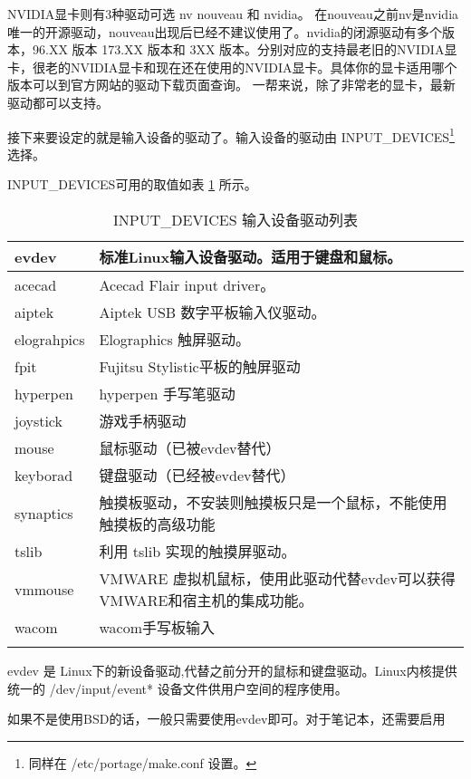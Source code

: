 NVIDIA显卡则有3种驱动可选 nv nouveau 和 nvidia。 在nouveau之前nv是nvidia唯一的开源驱动，nouveau出现后已经不建议使用了。nvidia的闭源驱动有多个版本，96.XX 版本 173.XX 版本和 3XX 版本。分别对应的支持最老旧的NVIDIA显卡，很老的NVIDIA显卡和现在还在使用的NVIDIA显卡。具体你的显卡适用哪个版本可以到官方网站的驱动下载页面查询。
一帮来说，除了非常老的显卡，最新驱动都可以支持。

接下来要设定的就是输入设备的驱动了。输入设备的驱动由 INPUT\_DEVICES\footnote{同样在 /etc/portage/make.conf 设置。} 选择。

INPUT\_DEVICES可用的取值如表 \ref{table:inputdevice} 所示。


\begin{longtable}{|l|p{}|}
\caption{INPUT\_DEVICES 输入设备驱动列表}\label{table:inputdevice}\\\hline
evdev & 标准Linux输入设备驱动。适用于键盘和鼠标。 \\\hline
acecad & Acecad Flair input driver。  \\\hline
aiptek & Aiptek  USB 数字平板输入仪驱动。 \\\hline
elograhpics & Elographics 触屏驱动。\\\hline
fpit & Fujitsu Stylistic平板的触屏驱动 \\\hline
hyperpen & hyperpen 手写笔驱动 \\\hline
joystick & 游戏手柄驱动 \\\hline
mouse & 鼠标驱动（已被evdev替代） \\\hline
keyborad & 键盘驱动（已经被evdev替代）\\\hline
synaptics & 触摸板驱动，不安装则触摸板只是一个鼠标，不能使用触摸板的高级功能 \\\hline
tslib & 利用 tslib 实现的触摸屏驱动。 \\\hline
vmmouse & VMWARE 虚拟机鼠标，使用此驱动代替evdev可以获得VMWARE和宿主机的集成功能。\\\hline
wacom & wacom手写板输入 \\\hline

\caption{INPUT\_DEVICES 输入设备驱动列表}
\end{longtable}


evdev 是 Linux下的新设备驱动,代替之前分开的鼠标和键盘驱动。Linux内核提供统一的 /dev/input/event* 设备文件供用户空间的程序使用。

如果不是使用BSD的话，一般只需要使用evdev即可。对于笔记本，还需要启用 

